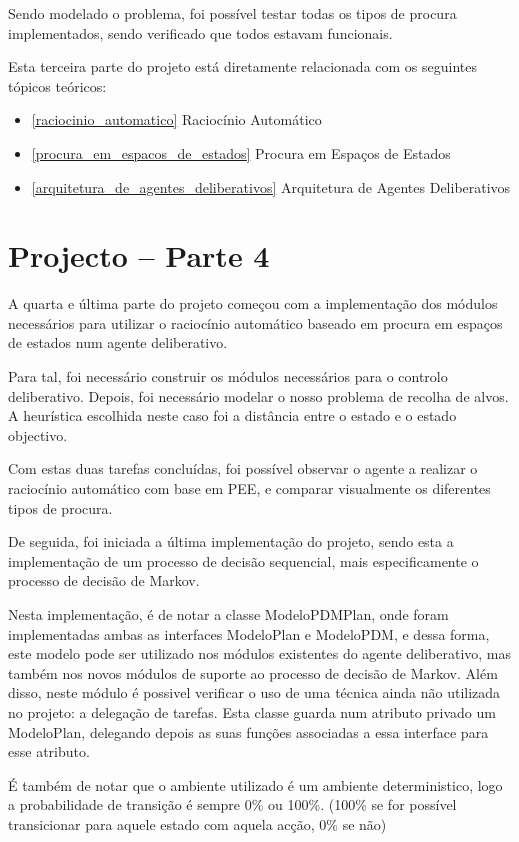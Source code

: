 \documentclass[a4paper,12pt]{article}
\begin{document}
Sendo modelado o problema, foi possível testar todas os tipos de procura implementados, sendo verificado que todos estavam funcionais.

Esta terceira parte do projeto está diretamente relacionada com os seguintes tópicos teóricos:

\begin{itemize}
	\item \ref{raciocinio_automatico} Raciocínio Automático
	\item \ref{procura_em_espacos_de_estados} Procura em Espaços de Estados
	\item \ref{arquitetura_de_agentes_deliberativos} Arquitetura de Agentes Deliberativos
\end{itemize}

\newpage
\section{Projecto – Parte 4}
A quarta e última parte do projeto começou com a implementação dos módulos necessários para utilizar o raciocínio automático baseado em procura em espaços de estados num agente deliberativo.

Para tal, foi necessário construir os módulos necessários para o controlo deliberativo. Depois, foi necessário modelar o nosso problema de recolha de alvos.
A heurística escolhida neste caso foi a distância entre o estado e o estado objectivo.

Com estas duas tarefas concluídas, foi possível observar o agente a realizar o raciocínio automático com base em PEE, e comparar visualmente os diferentes tipos de procura.

De seguida, foi iniciada a última implementação do projeto, sendo esta a implementação de um processo de decisão sequencial, mais especificamente o processo de decisão de Markov.

Nesta implementação, é de notar a classe ModeloPDMPlan, onde foram implementadas ambas as interfaces ModeloPlan e ModeloPDM, e dessa forma, este modelo pode ser utilizado nos módulos existentes do agente deliberativo, mas também nos novos módulos de suporte ao processo de decisão de Markov. Além disso, neste módulo é possivel verificar o uso de uma técnica ainda não utilizada no projeto: a delegação de tarefas. Esta classe guarda num atributo privado um ModeloPlan, delegando depois as suas funções associadas a essa interface para esse atributo.

É também de notar que o ambiente utilizado é um ambiente deterministico, logo a probabilidade de transição é sempre 0\% ou 100\%. (100\% se for possível transicionar para aquele estado com aquela acção, 0\% se não)
\end{document}
